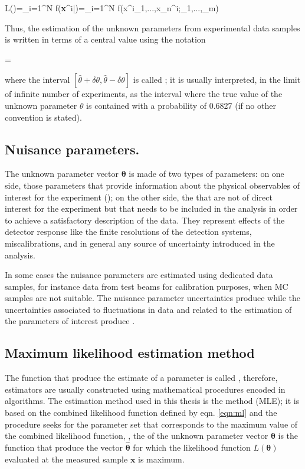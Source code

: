 \beqn
L(\bm{\theta})=\prod_{i=1}^N f(\textbf{x}^i|\bm{\theta})=\prod_{i=1}^N f(x^i_1,...,x_n^i;\theta_1,...,\theta_m)\label{eqn:ml}
\eeqn

Thus, the estimation of the unknown parameters from experimental data samples is written in terms of a central value using the notation

\beqn
\theta=\hat{\theta}\pm\delta \theta  
\eeqn

where the interval $[\hat{\theta}+\delta \theta, \hat{\theta}-\delta \theta]$ is called ; it is usually interpreted, in the limit of infinite number of experiments, as the interval where the true value of the unknown parameter $\theta$ is contained with a probability of 0.6827 (if no other convention is stated).  

\subsection{Nuisance parameters.}

The unknown parameter vector $\bm{\theta}$ is made of two types of parameters: on one side, those parameters that provide information about the physical observables of interest for the experiment (); on the other side, the  that are not of direct interest for the experiment but that needs to be included in the analysis in order to achieve a satisfactory description of the data. They represent effects of the detector response like the finite resolutions of the detection systems, miscalibrations, and in general any source of uncertainty introduced in the analysis.

In some cases the nuisance parameters are estimated using dedicated data samples, for instance data from test beams for calibration purposes, when MC samples are not suitable. The nuisance parameter uncertainties produce  while the uncertainties associated to fluctuations in data and related to the estimation of the parameters of interest produce .

\subsection{Maximum likelihood estimation method}

The function that produce the estimate of a parameter is called , therefore, estimators are usually constructed using mathematical procedures encoded in algorithms. The estimation method used in this thesis is the  method (MLE); it is based on the combined likelihood function defined by eqn. \ref{eqn:ml} and the procedure seeks for the parameter set that corresponds to the maximum value of the combined likelihood function, \ie, the  of the unknown parameter vector $\bm{\theta}$ is the function that produce the vector $\bm{\hat \theta}$ for which the likelihood function $L(\bm{\theta})$ evaluated at the measured sample $\textbf{x}$ is maximum.  

